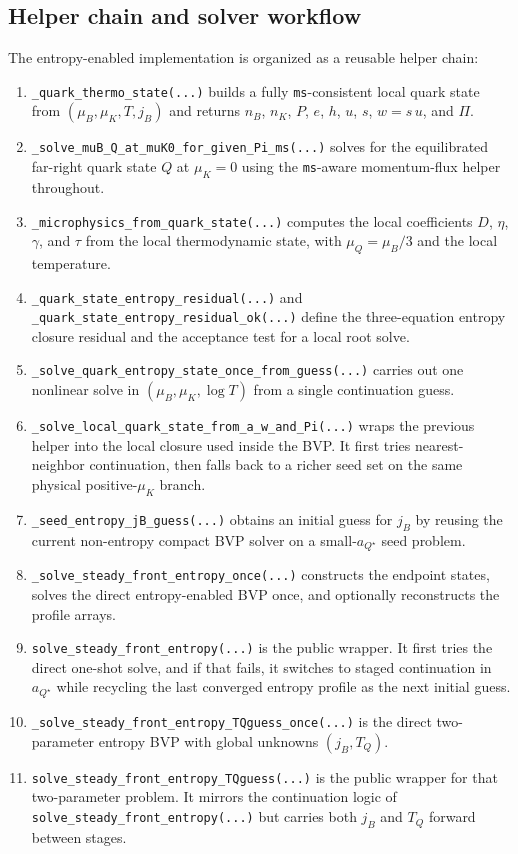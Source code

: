 \documentclass[11pt]{article}
\begin{document}
\subsection{Helper chain and solver workflow}
The entropy-enabled implementation is organized as a reusable helper chain:
\begin{enumerate}[leftmargin=1.5em]
\item \texttt{\_quark\_thermo\_state(...)} builds a fully
      \texttt{ms}-consistent local quark state from
      $(\mu_B,\mu_K,T,j_B)$ and returns
      $n_B$, $n_K$, $P$, $e$, $h$, $u$, $s$, $w=s\,u$, and $\Pi$.
\item \texttt{\_solve\_muB\_Q\_at\_muK0\_for\_given\_Pi\_ms(...)} solves for
      the equilibrated far-right quark state $Q$ at $\mu_K=0$ using the
      \texttt{ms}-aware momentum-flux helper throughout.
\item \texttt{\_microphysics\_from\_quark\_state(...)} computes the local
      coefficients $D$, $\eta$, $\gamma$, and $\tau$ from the local
      thermodynamic state, with $\mu_Q=\mu_B/3$ and the local temperature.
\item \texttt{\_quark\_state\_entropy\_residual(...)} and
      \texttt{\_quark\_state\_entropy\_residual\_ok(...)} define the
      three-equation entropy closure residual and the acceptance test for a
      local root solve.
\item \texttt{\_solve\_quark\_entropy\_state\_\allowbreak once\_from\_guess(...)}
      carries out one nonlinear solve in $(\mu_B,\mu_K,\log T)$ from a single
      continuation guess.
\item \texttt{\_solve\_local\_quark\_state\_from\_a\_w\_and\_Pi(...)} wraps
      the previous helper into the local closure used inside the BVP. It
      first tries nearest-neighbor continuation, then falls back to a richer
      seed set on the same physical positive-$\mu_K$ branch.
\item \texttt{\_seed\_entropy\_jB\_guess(...)} obtains an initial guess
      for $j_B$ by reusing the current non-entropy compact BVP solver on a
      small-$a_{Q^\star}$ seed problem.
\item \texttt{\_solve\_steady\_front\_entropy\_once(...)} constructs the
      endpoint states, solves the direct entropy-enabled BVP once, and
      optionally reconstructs the profile arrays.
\item \texttt{solve\_steady\_front\_entropy(...)} is the public wrapper. It
      first tries the direct one-shot solve, and if that fails, it switches to
      staged continuation in $a_{Q^\star}$ while recycling the last converged
      entropy profile as the next initial guess.
\item \texttt{\_solve\_steady\_front\_entropy\_TQguess\_once(...)} is the
      direct two-parameter entropy BVP with global unknowns $(j_B,T_Q)$.
\item \texttt{solve\_steady\_front\_entropy\_TQguess(...)} is the public
      wrapper for that two-parameter problem. It mirrors the continuation
      logic of \texttt{solve\_steady\_front\_entropy(...)} but carries both
      $j_B$ and $T_Q$ forward between stages.
\end{enumerate}
\end{document}
